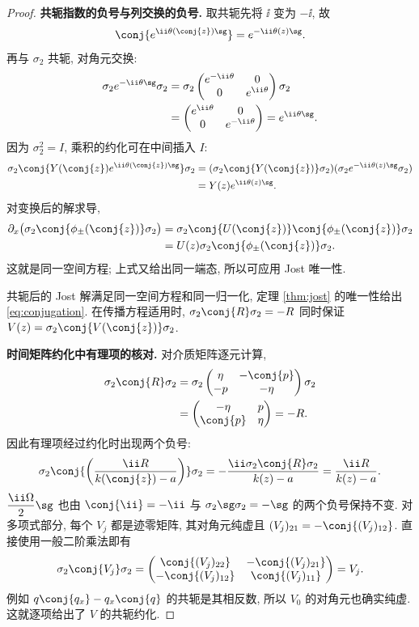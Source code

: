 \begin{proof}
\par\medskip\noindent\textbf{共轭指数的负号与列交换的负号.}\quad 
取共轭先将 $\ii$ 变为 $-\ii$, 故
\[
\conj{e^{\ii\theta(\conj{z})\sg}}
=e^{-\ii\theta(z)\sg}.
\]
再与 $\sigma_2$ 共轭, 对角元交换:
\begin{align*}
\sigma_2 e^{-\ii\theta\sg}\sigma_2
&=\sigma_2\begin{pmatrix}e^{-\ii\theta}&0\\0&e^{\ii\theta}\end{pmatrix}\sigma_2\\
&=\begin{pmatrix}e^{\ii\theta}&0\\0&e^{-\ii\theta}\end{pmatrix}
=e^{\ii\theta\sg}.
\end{align*}
因为 $\sigma_2^2=I$, 乘积的约化可在中间插入 $I$:
\begin{align*}
\sigma_2\conj{Y(\conj{z})e^{\ii\theta(\conj{z})\sg}}\sigma_2
&=(\sigma_2\conj{Y(\conj{z})}\sigma_2)
(\sigma_2 e^{-\ii\theta(z)\sg}\sigma_2)\\
&=Y(z)e^{\ii\theta(z)\sg}.
\end{align*}
对变换后的解求导,
\begin{align*}
\partial_x\bigl(\sigma_2\conj{\phi_\pm(\conj{z})}\sigma_2\bigr)
&=\sigma_2\conj{U(\conj{z})}\conj{\phi_\pm(\conj{z})}\sigma_2\\
&=U(z)\sigma_2\conj{\phi_\pm(\conj{z})}\sigma_2.
\end{align*}
这就是同一空间方程; 上式又给出同一端态,
所以可应用 Jost 唯一性.

共轭后的 Jost 解满足同一空间方程和同一归一化, 定理 \ref{thm:jost} 的唯一性给出 \eqref{eq:conjugation}. 在传播方程适用时, $\sigma_2\conj{R}\sigma_2=-R$ 同时保证 $V(z)=\sigma_2\conj{V(\conj{z})}\sigma_2$.


\par\medskip\noindent\textbf{时间矩阵约化中有理项的核对.}\quad 
对介质矩阵逐元计算,
\begin{align*}
\sigma_2\conj{R}\sigma_2
&=\sigma_2
\begin{pmatrix}\eta&-\conj{p}\\-p&-\eta\end{pmatrix}\sigma_2\\
&=\begin{pmatrix}-\eta&p\\\conj{p}&\eta\end{pmatrix}=-R.
\end{align*}
因此有理项经过约化时出现两个负号:
\[
\sigma_2\conj{\left(\dfrac{\ii R}{k(\conj{z})-a}\right)}\sigma_2
=-\dfrac{\ii\sigma_2\conj{R}\sigma_2}{k(z)-a}
=\dfrac{\ii R}{k(z)-a}.
\]
$\dfrac{\ii\Omega}{2}\sg$ 也由
$\conj{\ii}=-\ii$ 与 $\sigma_2\sg\sigma_2=-\sg$
的两个负号保持不变.
对多项式部分, 每个 $V_j$ 都是迹零矩阵,
其对角元纯虚且 $(V_j)_{21}=-\conj{(V_j)_{12}}$.
直接使用一般二阶乘法即有
\[
\sigma_2\conj{V_j}\sigma_2
=\begin{pmatrix}
\conj{(V_j)_{22}}&-\conj{(V_j)_{21}}\\
-\conj{(V_j)_{12}}&\conj{(V_j)_{11}}
\end{pmatrix}=V_j.
\]
例如 $q\conj{q_x}-q_x\conj{q}$ 的共轭是其相反数,
所以 $V_0$ 的对角元也确实纯虚.
这就逐项给出了 $V$ 的共轭约化.


\end{proof}
